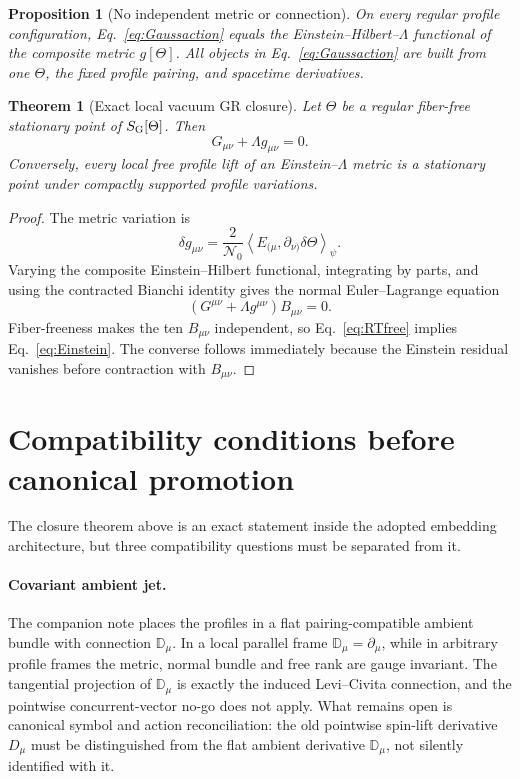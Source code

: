 \documentclass[11pt,a4paper]{article}
\newtheorem{theorem}[definition]{Theorem}
\newtheorem{proposition}[definition]{Proposition}
\theoremstyle{remark}
\newcommand{\Nzero}{\mathcal N_0}
\newcommand{\avg}[1]{\left\langle #1\right\rangle_\psi}
\begin{document}
\begin{proposition}[No independent metric or connection]
On every regular profile configuration, Eq.~\eqref{eq:Gaussaction} equals the
Einstein--Hilbert--$\Lambda$ functional of the composite metric
$g[\Theta]$.  All objects in Eq.~\eqref{eq:Gaussaction} are built from one
$\Theta$, the fixed profile pairing, and spacetime derivatives.
\end{proposition}

\begin{theorem}[Exact local vacuum GR closure]
Let $\Theta$ be a regular fiber-free stationary point of
$S_{\rm G}[\Theta]$.  Then
\begin{equation}
 \boxed{G_{\mu\nu}+\Lambda g_{\mu\nu}=0.}
 \label{eq:Einstein}
\end{equation}
Conversely, every local free profile lift of an Einstein--$\Lambda$ metric is
a stationary point under compactly supported profile variations.
\end{theorem}

\begin{proof}
The metric variation is
\[
 \delta g_{\mu\nu}
 =\frac2{\Nzero}\avg{E_{(\mu},\partial_{\nu)}\delta\Theta}.
\]
Varying the composite Einstein--Hilbert functional, integrating by parts, and
using the contracted Bianchi identity gives the normal Euler--Lagrange
equation
\begin{equation}
 (G^{\mu\nu}+\Lambda g^{\mu\nu})B_{\mu\nu}=0.
 \label{eq:RTfree}
\end{equation}
Fiber-freeness makes the ten $B_{\mu\nu}$ independent, so
Eq.~\eqref{eq:RTfree} implies Eq.~\eqref{eq:Einstein}.  The converse follows
immediately because the Einstein residual vanishes before contraction with
$B_{\mu\nu}$.
\end{proof}


\section{Compatibility conditions before canonical promotion}

The closure theorem above is an exact statement inside the adopted embedding
architecture, but three compatibility questions must be separated from it.

\paragraph{Covariant ambient jet.}
The companion note
 places the profiles in
a flat pairing-compatible ambient bundle with connection $\mathbb D_\mu$.
In a local parallel frame $\mathbb D_\mu=\partial_\mu$, while in arbitrary
profile frames the metric, normal bundle and free rank are gauge invariant.
The tangential projection of $\mathbb D_\mu$ is exactly the induced
Levi--Civita connection, and the pointwise concurrent-vector no-go does not
apply.  What remains open is canonical symbol and action reconciliation: the
old pointwise spin-lift derivative $D_\mu$ must be distinguished from the flat
ambient derivative $\mathbb D_\mu$, not silently identified with it.
\end{document}
